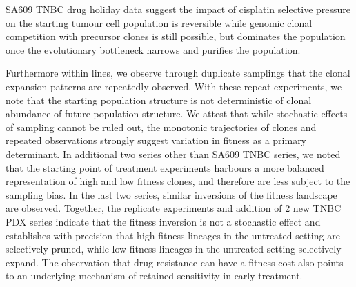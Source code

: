 SA609 TNBC drug holiday data suggest the impact of cisplatin selective pressure on the starting tumour cell population is reversible while genomic clonal competition with precursor clones is still possible, but dominates the population once the evolutionary bottleneck narrows and purifies the population.

Furthermore within lines, we observe through duplicate samplings that the clonal expansion patterns are repeatedly observed. With these repeat experiments, we note that the starting population structure is not deterministic of clonal abundance of future population structure.  We attest that while stochastic effects of sampling cannot be ruled out, the monotonic trajectories of clones and repeated observations strongly suggest variation in fitness as a primary determinant. In additional two series other than SA609 TNBC series, we noted that the starting point of treatment experiments harbours a more balanced representation of high and low fitness clones, and therefore are less subject to the sampling bias.  In the last two series, similar inversions of the fitness landscape are observed.  Together, the replicate experiments and addition of 2 new TNBC PDX series indicate that the fitness inversion is not a stochastic effect and establishes with precision that high fitness lineages in the untreated setting are selectively pruned, while low fitness lineages in the untreated setting selectively expand. The observation that drug resistance can have a fitness cost also points to an underlying mechanism of retained sensitivity in early treatment.




